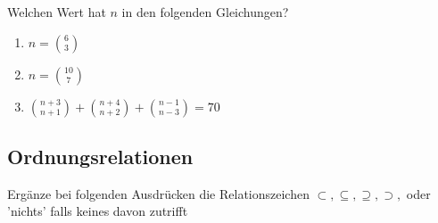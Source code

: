 \documentclass[11pt, a4paper]{article}
\newif\ifshowsolution
\begin{document}
Welchen Wert hat $n$ in den folgenden Gleichungen?
\begin{enumerate}
	\item $ n = \binom{6}{3}$
	
	\ifshowsolution
		$ n = \binom{6}{3} = \frac{6!}{3!(6-3)!} = \frac{\cancel{1\cdot2\cdot3}\cdot4\cdot5\cdot6}{\cancel{(1\cdot2\cdot3)}3!} = \frac{4\cdot5\cdot\cancel{6}}{1\cdot\cancel{2\cdot3}} = 4\cdot5 = 20$
	\fi
	
	\item $n = \binom{10}{7}$
	
	\ifshowsolution
		$n = \binom{10}{7} = \frac{10!}{7!(10-7)!} = \frac{8 \cdot 9 \cdot 10}{3!} = \frac{720}{6} = 120$
	\fi
	
	\item $\binom{n+3}{n+1} + \binom{n+4}{n+2} + \binom{n-1}{n-3} = 70$
	\ifshowsolution
		\begin{align*}
			\binom{n+3}{2} + \binom{n+4}{2} + \binom{n-1}{2} &= 70 \\
			\frac{(n+3)!}{2!(n+3-2)!} + \frac{(n+4)!}{2!(n+4-2)!} + \frac{(n-1)!}{2!(n-1-2)!} &= 70 \tag{Definition} \\
			\frac{(n+3)!}{2(n+1)!} + \frac{(n+4)!}{2(n+2)!} + \frac{(n-1)!}{2(n-3)!} &= 70 \\
			\frac{(n+3)!}{(n+1)!} + \frac{(n+4)!}{(n+2)!} + \frac{(n-1)!}{(n-3)!} &= 140 \tag{Kürzen} \\
			(n+2)(n+3) + (n+3)(n+4) + (n-2)(n-1) &= 140 \\
			n^2+5n+6 + n^2+7n+12 + n^2-3n+2 &= 140 \\
			3n^2+9n-120 &= 0 \\
			n^2+3n-40 &= 0 \tag{PQ-Formel} \\
			x_1 = -8, \quad x_2 &= 5 \tag{Probe!}
		\end{align*}
		Der einfache Binomialkoeffizient ist nur für positive Zahlen definiert, die Lösung ist also $x=1$.
	\fi
\end{enumerate}

\subsection{Ordnungsrelationen}
Ergänze bei folgenden Ausdrücken die Relationszeichen $\subset, \subseteq, \supseteq, \supset,$ oder 'nichts' falls keines davon zutrifft
\end{document}
